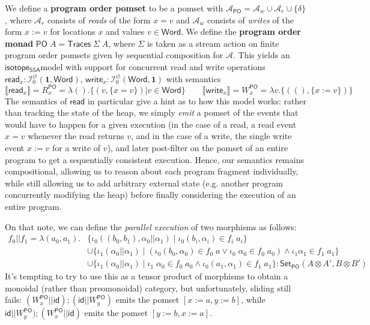 \documentclass[acmsmall,screen,review]{acmart}
\newcommand{\mc}[1]{\ensuremath{\mathcal{#1}}}
\newcommand{\mb}[1]{\ensuremath{\mathbf{#1}}}
\newcommand{\ms}[1]{\ensuremath{\mathsf{#1}}}
\newcommand{\dnt}[1]{\llbracket{#1}\rrbracket}
\newcommand{\isotopessa}{\ms{isotope_{SSA}}}
\begin{document}
We define a \textbf{program order pomset} to be a pomset with \(\mc{A}_{\ms{PO}}
= \mc{A}_w \cup \mc{A}_r \cup \{\delta\}\), where \(\mc{A}_r\) consists of
\textit{reads} of the form \(x = v\) and \(\mc{A}_w\) consists of
\textit{writes} of the form \(x := v\) for locations \(x\) and values \(v \in
\ms{Word}\). We define the \textbf{program order monad} \(\ms{PO}\;A =
\ms{Traces}\;\Sigma\;A\), where \(\Sigma\) is taken as a stream action on finite
program order pomsets given by sequential composition for \(\mc{A}\). This
yields an \isotopessa model with support for concurrent read and write
operations \(\ms{read}_x: \mc{I}^\varnothing_0(\mb{1}, \ms{Word})\),
\(\ms{write}_x: \mc{I}^\varnothing_0(\ms{Word}, \mb{1})\) with semantics
\begin{equation}
  \dnt{\ms{read}_x} = R_x^{\ms{PO}} = \lambda (). \{(v, \{x = v\}) | v \in \ms{Word}\}
  \qquad
  \dnt{\ms{write}_x} = W_x^{\ms{PO}} =  \lambda v. \{((), \{x := v\})\}
\end{equation}
The semantics of \(\ms{read}\) in particular give a hint as to how this model
works: rather than tracking the state of the heap, we simply \textit{emit} a
pomset of the events that would have to happen for a given execution (in the
case of a read, a read event \(x = v\) whenever the read returns \(v\), and in
the case of a write, the single write event \(x := v\) for a write of \(v\)),
and later post-filter on the pomset of an entire program to get a sequentially
consistent execution. Hence, our semantics remains compositional, allowing us to
reason about each program fragment individually, while still allowing us to add
arbitrary external state (e.g. another program concurrently modifying the heap)
before finally considering the execution of an entire program.

On that note, we can define the \textit{parallel execution} of two morphisms as
follows:
\begin{equation}
  \begin{aligned}
  f_0 || f_1 = \lambda (a_0, a_1). 
  & \{\iota_0 ((b_0, b_1), \alpha_0 || \alpha_1) 
    \mid \iota_0 (b_i, \alpha_i) \in f_i\;a_i\} 
  \\ & \cup \{\iota_1 (\alpha_0 || \alpha_1) \mid (\iota_0 (b_0, \alpha_0) \in f_0\;a \lor \iota_0\;\alpha_0 \in f_0\;a_0) \land \iota_1 \alpha_1 \in f_1\;a_1\} 
  \\ & \cup \{\iota_1 (\alpha_0 || \alpha_1) \mid \iota_1\;\alpha_0 \in f_0\;a_0 \land \iota_0 (a_1, \alpha_1) \in f_1\;a_1\}: \ms{Set}_{\ms{PO}}(A \otimes A', B \otimes B')
  \end{aligned}
\end{equation}
It's tempting to try to use this as a tensor product of morphisms to obtain a
monoidal (rather than preomonoidal) category, but unfortunately, sliding still
fails: \((W_x^{\ms{PO}} || \ms{id}) ; (\ms{id} || W_y^{\ms{PO}})\) emits the
pomset \([x := a, y := b]\), while \(\ms{id} || W_y^{\ms{PO}}) ; (W_x^{\ms{PO}}
|| \ms{id})\) emits the pomset \([y := b, x := a]\). 
\end{document}
